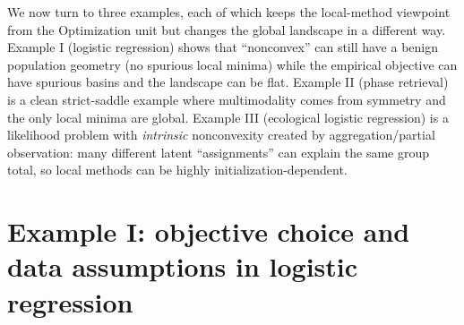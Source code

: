 \documentclass[11pt]{article}
\begin{document}
We now turn to three examples, each of which keeps the local-method viewpoint from the Optimization unit but changes the global landscape in a different way.
Example I (logistic regression) shows that ``nonconvex'' can still have a benign population geometry (no spurious local minima) while the empirical objective can have spurious basins and the landscape can be flat.
Example II (phase retrieval) is a clean strict-saddle example where multimodality comes from symmetry and the only local minima are global.
Example III (ecological logistic regression) is a likelihood problem with \emph{intrinsic} nonconvexity created by aggregation/partial observation: many different latent ``assignments'' can explain the same group total, so local methods can be highly initialization-dependent.

\section[Example I (logistic)]{Example I: objective choice and data assumptions in logistic regression}
\label{sec:logistic-bridge}
\end{document}
